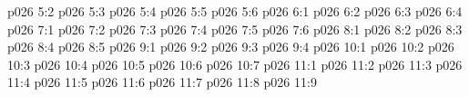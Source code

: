 \vs p026 5:2 
\vs p026 5:3 
\vs p026 5:4 
\vs p026 5:5 
\vs p026 5:6 
\vs p026 6:1 
\vs p026 6:2 
\vs p026 6:3 
\vs p026 6:4 
\vs p026 7:1 
\vs p026 7:2 
\vs p026 7:3 
\vs p026 7:4 
\vs p026 7:5 \pc 
\vs p026 7:6 
\vs p026 8:1 
\vs p026 8:2 
\vs p026 8:3 
\vs p026 8:4 \pc 
\vs p026 8:5 
\vs p026 9:1 
\vs p026 9:2 
\vs p026 9:3 \pc 
\vs p026 9:4 
\vs p026 10:1 
\vs p026 10:2 \pc 
\vs p026 10:3 
\vs p026 10:4 
\vs p026 10:5 
\vs p026 10:6 
\vs p026 10:7 
\vs p026 11:1 
\vs p026 11:2 \pc 
\vs p026 11:3 
\vs p026 11:4 
\vs p026 11:5 \pc 
\vs p026 11:6 \pc 
\vs p026 11:7 
\vs p026 11:8 
\vsetoff
\vs p026 11:9 
\quizlink
